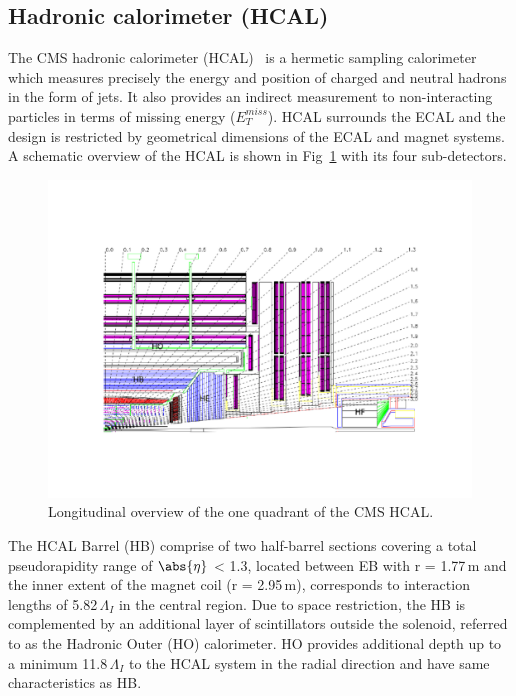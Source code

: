 \subsection{Hadronic calorimeter (HCAL)}
The CMS hadronic calorimeter (HCAL)~\cite{hcal} is a hermetic sampling calorimeter which measures precisely the energy and position of charged and neutral hadrons in the form of jets. It also provides an indirect measurement to non-interacting particles in terms of missing energy ($E_{T}^{miss}$). HCAL surrounds the ECAL and the design is restricted by geometrical dimensions of the ECAL and magnet systems. A schematic overview of the HCAL is shown in Fig~\ref{fig:hcal} with its four sub-detectors.
\begin{figure}[h!]
\centering
\includegraphics[scale=0.8, trim=90 100 80 80,clip]{fig/lhc/HCAL.pdf}
\caption{\label{fig:hcal} Longitudinal overview of the one quadrant of the CMS HCAL.}
\end{figure}
The HCAL Barrel (HB) comprise of two half-barrel sections covering a total pseudorapidity range of $\abs{\eta}$ < 1.3, located between EB with r = 1.77\,m and the inner extent of the magnet coil (r = 2.95\,m), corresponds to interaction lengths of 5.82\,$\Lambda_{I}$ in the central region. Due to space restriction, the HB is complemented by an additional layer of scintillators outside the solenoid, referred to as the Hadronic Outer (HO) calorimeter. HO provides additional depth up to a minimum 11.8\,$\Lambda_{I}$ to the HCAL system in the radial direction and have same characteristics as HB. 

